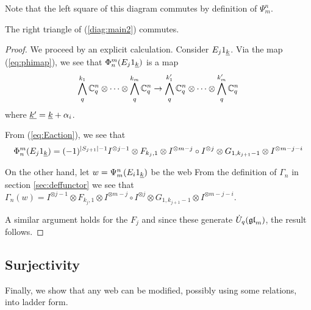 \documentclass[10pt,leqno]{article}
\begin{document}
Note that the left square of this diagram commutes by definition of $\Psi^n_m $.

\begin{prop}
\label{prop:commutes}
The right triangle of (\ref{diag:main2}) commutes.
\end{prop}

\begin{proof}
We proceed by an explicit calculation.  Consider $ E_j 1_{{\underline{k}}}$.  Via the map (\ref{eq:phimap}), we see that $\Phi_n^m(E_j 1_{{\underline{k}}}) $ is a map
$$
\bigwedge_q^{k_1} {\mathbb{C}}_q^n \otimes \cdots \otimes \bigwedge_q^{k_m} {\mathbb{C}}_q^n \rightarrow \bigwedge^{k'_1}_q {\mathbb{C}}_q^n \otimes \cdots \otimes \bigwedge_q^{k'_m} {\mathbb{C}}_q^n
$$
where $ {\underline{k'}} = {\underline{k}} + \alpha_i $.

From (\ref{eq:Eaction}), we see that $$ \Phi_n^m(E_j 1_{{\underline{k}}}) = (-1)^{|S_{j+1}| -1} I^{\otimes j-1} \otimes F_{k_j,1} \otimes I^{\otimes m-j} \circ I^{\otimes j} \otimes G_{1, k_{j+1} - 1} \otimes I^{\otimes m-j - i} $$

On the other hand, let $ w = \Psi^n_m(E_i 1_{{\underline{k}}})$ be the web
From the definition of $\Gamma_n $ in section \ref{sec:deffunctor} we see that $ \Gamma_n(w) = I^{\otimes j-1} \otimes F_{k_j,1} \otimes I^{\otimes m-j} \circ I^{\otimes j} \otimes G_{1, k_{j+1} - 1} \otimes I^{\otimes m-j - i} $. 
  
A similar argument holds for the $F_j $ and since these generate $\dot{{{U}}}_q({\mathfrak{gl}}_m) $, the result follows.

\end{proof}

\subsection{Surjectivity}
Finally, we show that any web can be modified, possibly using some relations, into ladder form.
\end{document}
